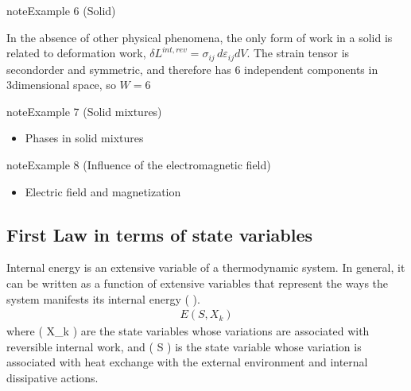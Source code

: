 \documentclass[letterpaper,10pt,english]{jupyterBook}
\begin{document}
\label{ch/principles-gibbs-phase-rule:example-9}
\begin{sphinxadmonition}{note}{Example 6 (Solid)}



\sphinxAtStartPar
In the absence of other physical phenomena, the only form of work in a solid is related to deformation work, \(\delta L^{int,rev} = \sigma_{ij} \, d \varepsilon_{ij} dV\). The strain tensor is second\sphinxhyphen{}order and symmetric, and therefore has 6 independent components in 3\sphinxhyphen{}dimensional space, so \(W=6\)
\end{sphinxadmonition}
\label{ch/principles-gibbs-phase-rule:example-10}
\begin{sphinxadmonition}{note}{Example 7 (Solid mixtures)}


\begin{itemize}
\item {} 
\sphinxAtStartPar
Phases in solid mixtures 

\end{itemize}
\end{sphinxadmonition}
\label{ch/principles-gibbs-phase-rule:example-11}
\begin{sphinxadmonition}{note}{Example 8 (Influence of the electromagnetic field)}


\begin{itemize}
\item {} 
\sphinxAtStartPar
Electric field and magnetization 

\end{itemize}
\end{sphinxadmonition}


\subsection{First Law in terms of state variables}
\label{\detokenize{ch/principles-gibbs-phase-rule:first-law-in-terms-of-state-variables}}
\sphinxAtStartPar
Internal energy is an extensive variable of a thermodynamic system. In general, it can be written as a function of extensive variables that represent the ways the system manifests its internal energy ( ).
\begin{equation*}
\begin{split}E(S, X_k)\end{split}
\end{equation*}
\sphinxAtStartPar
where ( X\_k ) are the state variables whose variations are associated with reversible internal work, and ( S ) is the state variable whose variation is associated with heat exchange with the external environment and internal dissipative actions.  
\end{document}
